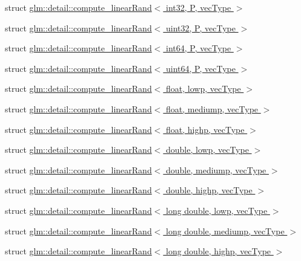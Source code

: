 \begin{DoxyCompactItemize}
\item 
struct \hyperlink{structglm_1_1detail_1_1compute__linearRand_3_01int32_00_01P_00_01vecType_01_4}{glm\+::detail\+::compute\+\_\+linear\+Rand$<$ int32, P, vec\+Type $>$}
\item 
struct \hyperlink{structglm_1_1detail_1_1compute__linearRand_3_01uint32_00_01P_00_01vecType_01_4}{glm\+::detail\+::compute\+\_\+linear\+Rand$<$ uint32, P, vec\+Type $>$}
\item 
struct \hyperlink{structglm_1_1detail_1_1compute__linearRand_3_01int64_00_01P_00_01vecType_01_4}{glm\+::detail\+::compute\+\_\+linear\+Rand$<$ int64, P, vec\+Type $>$}
\item 
struct \hyperlink{structglm_1_1detail_1_1compute__linearRand_3_01uint64_00_01P_00_01vecType_01_4}{glm\+::detail\+::compute\+\_\+linear\+Rand$<$ uint64, P, vec\+Type $>$}
\item 
struct \hyperlink{structglm_1_1detail_1_1compute__linearRand_3_01float_00_01lowp_00_01vecType_01_4}{glm\+::detail\+::compute\+\_\+linear\+Rand$<$ float, lowp, vec\+Type $>$}
\item 
struct \hyperlink{structglm_1_1detail_1_1compute__linearRand_3_01float_00_01mediump_00_01vecType_01_4}{glm\+::detail\+::compute\+\_\+linear\+Rand$<$ float, mediump, vec\+Type $>$}
\item 
struct \hyperlink{structglm_1_1detail_1_1compute__linearRand_3_01float_00_01highp_00_01vecType_01_4}{glm\+::detail\+::compute\+\_\+linear\+Rand$<$ float, highp, vec\+Type $>$}
\item 
struct \hyperlink{structglm_1_1detail_1_1compute__linearRand_3_01double_00_01lowp_00_01vecType_01_4}{glm\+::detail\+::compute\+\_\+linear\+Rand$<$ double, lowp, vec\+Type $>$}
\item 
struct \hyperlink{structglm_1_1detail_1_1compute__linearRand_3_01double_00_01mediump_00_01vecType_01_4}{glm\+::detail\+::compute\+\_\+linear\+Rand$<$ double, mediump, vec\+Type $>$}
\item 
struct \hyperlink{structglm_1_1detail_1_1compute__linearRand_3_01double_00_01highp_00_01vecType_01_4}{glm\+::detail\+::compute\+\_\+linear\+Rand$<$ double, highp, vec\+Type $>$}
\item 
struct \hyperlink{structglm_1_1detail_1_1compute__linearRand_3_01long_01double_00_01lowp_00_01vecType_01_4}{glm\+::detail\+::compute\+\_\+linear\+Rand$<$ long double, lowp, vec\+Type $>$}
\item 
struct \hyperlink{structglm_1_1detail_1_1compute__linearRand_3_01long_01double_00_01mediump_00_01vecType_01_4}{glm\+::detail\+::compute\+\_\+linear\+Rand$<$ long double, mediump, vec\+Type $>$}
\item 
struct \hyperlink{structglm_1_1detail_1_1compute__linearRand_3_01long_01double_00_01highp_00_01vecType_01_4}{glm\+::detail\+::compute\+\_\+linear\+Rand$<$ long double, highp, vec\+Type $>$}
\end{DoxyCompactItemize}
